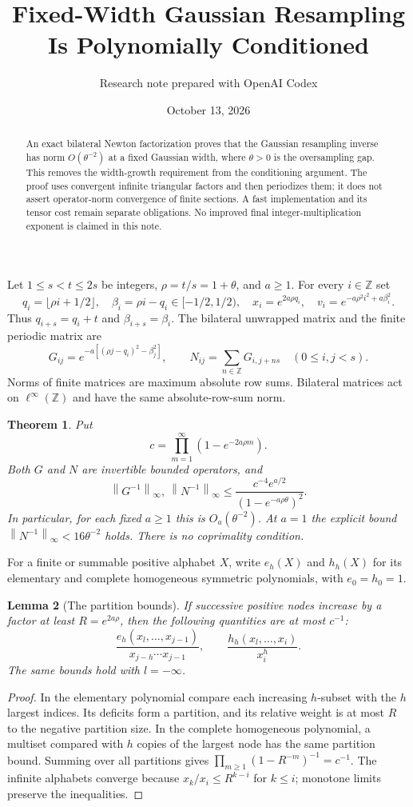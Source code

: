 \documentclass[11pt]{article}
\title{Fixed-Width Gaussian Resampling Is Polynomially Conditioned}
\author{Research note prepared with OpenAI Codex}
\date{October 13, 2026}
\newtheorem{theorem}{Theorem}
\newtheorem{lemma}[theorem]{Lemma}
\newcommand{\norm}[1]{\left\lVert#1\right\rVert_\infty}
\newcommand{\Z}{\mathbb Z}
\begin{document}
\maketitle
\begin{abstract}
An exact bilateral Newton factorization proves that the Gaussian
resampling inverse has norm $O(\theta^{-2})$ at a fixed Gaussian width,
where $\theta>0$ is the oversampling gap. This removes the width-growth
requirement from the conditioning argument. The proof uses convergent
infinite triangular factors and then periodizes them; it does not assert
operator-norm convergence of finite sections. A fast implementation and
its tensor cost remain separate obligations. No improved final
integer-multiplication exponent is claimed in this note.
\end{abstract}

Let $1\le s<t\le2s$ be integers, $\rho=t/s=1+\theta$, and $a\ge1$.
For every $i\in\Z$ set
\[
 q_i=\lfloor\rho i+1/2\rfloor,\quad
 \beta_i=\rho i-q_i\in[-1/2,1/2),\quad
 x_i=e^{2a\rho q_i},\quad
 v_i=e^{-a\rho^2i^2+a\beta_i^2}.
\]
Thus $q_{i+s}=q_i+t$ and $\beta_{i+s}=\beta_i$.
The bilateral unwrapped matrix and the finite periodic matrix are
\[
 G_{ij}=e^{-a[(\rho j-q_i)^2-\beta_j^2]},\qquad
 N_{ij}=\sum_{n\in\Z}G_{i,j+ns}\quad(0\le i,j<s).
\]
Norms of finite matrices are maximum absolute row sums. Bilateral
matrices act on $\ell^\infty(\Z)$ and have the same absolute-row-sum norm.

\begin{theorem}\label{thm:main}
Put
\[
 c=\prod_{m=1}^{\infty}(1-e^{-2a\rho m}).
\]
Both $G$ and $N$ are invertible bounded operators, and
\[
 \norm{G^{-1}},\ \norm{N^{-1}}
 \le \frac{c^{-4}e^{a/2}}{(1-e^{-a\rho\theta})^2}.
\]
In particular, for each fixed $a\ge1$ this is $O_a(\theta^{-2})$.
At $a=1$ the explicit bound $\norm{N^{-1}}<16\theta^{-2}$ holds.
There is no coprimality condition.
\end{theorem}

For a finite or summable positive alphabet $X$, write $e_h(X)$ and
$h_h(X)$ for its elementary and complete homogeneous symmetric
polynomials, with $e_0=h_0=1$.

\begin{lemma}[The partition bounds]\label{lem:partition}
If successive positive nodes increase by a factor at least
$R=e^{2a\rho}$, then the following quantities are at most $c^{-1}$:
\[
 \frac{e_h(x_l,\ldots,x_{j-1})}
      {x_{j-h}\cdots x_{j-1}},\qquad
 \frac{h_h(x_l,\ldots,x_i)}{x_i^h}.
\]
The same bounds hold with $l=-\infty$.
\end{lemma}
\begin{proof}
In the elementary polynomial compare each increasing $h$-subset with
the $h$ largest indices. Its deficits form a partition, and its relative
weight is at most $R$ to the negative partition size. In the complete
homogeneous polynomial, a multiset compared with $h$ copies of the
largest node has the same partition bound. Summing over all partitions
gives $\prod_{m\ge1}(1-R^{-m})^{-1}=c^{-1}$.
The infinite alphabets converge because $x_k/x_i\le R^{k-i}$ for
$k\le i$; monotone limits preserve the inequalities.
\end{proof}
\end{document}
